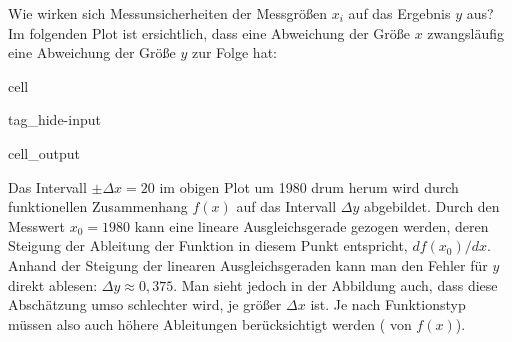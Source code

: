 \documentclass[letterpaper,10pt,english]{jupyterBook}
\begin{document}
\sphinxAtStartPar
Wie wirken sich Messunsicherheiten der Messgrößen \(x_i\) auf das Ergebnis \(y\) aus? Im folgenden Plot ist ersichtlich, dass eine Abweichung der Größe \(x\) zwangsläufig eine Abweichung der Größe \(y\) zur Folge hat:

\begin{sphinxuseclass}{cell}
\begin{sphinxuseclass}{tag_hide-input}\begin{sphinxVerbatimOutput}

\begin{sphinxuseclass}{cell_output}
\noindent{}

\end{sphinxuseclass}\end{sphinxVerbatimOutput}

\end{sphinxuseclass}
\end{sphinxuseclass}
\sphinxAtStartPar
Das Intervall \(\pm \Delta x = 20\) im obigen Plot um 1980 drum herum wird durch  funktionellen Zusammenhang \(f(x)\) auf das Intervall \(\Delta y\) abgebildet. Durch den Messwert \(x_0 = 1980\) kann eine lineare Ausgleichsgerade gezogen werden, deren Steigung der Ableitung der Funktion in diesem Punkt entspricht, \(df(x_0)/dx\). Anhand der Steigung der linearen Ausgleichsgeraden kann man den Fehler für \(y\) direkt ablesen: \(\Delta y \approx 0,375\). Man sieht jedoch in der Abbildung auch, dass diese Abschätzung umso schlechter wird, je größer \(\Delta x\) ist. Je nach Funktionstyp müssen also auch höhere Ableitungen berücksichtigt werden ( von \(f(x)\)).
\end{document}
